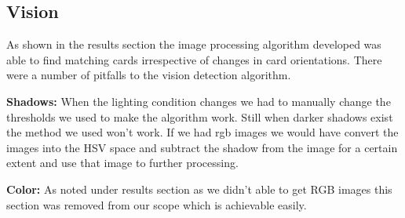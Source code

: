 \subsection{Vision}
As shown in the results section the image processing algorithm developed was able to find matching cards irrespective of changes in card orientations. There were a number of pitfalls to the vision detection algorithm.

\textbf{Shadows:} When the lighting condition changes we had to manually change the thresholds we used to make the algorithm work. Still when darker shadows exist the method we used won't work. 
If we had rgb images we would have convert the images into the HSV space and subtract the shadow from the image for a certain extent and use that image to further processing.
  
\textbf{Color:} As noted under results section as we didn't able to get RGB images this section was removed from our scope which is achievable easily.
